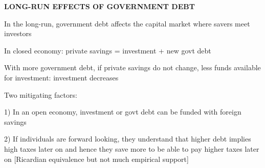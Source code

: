 \documentclass[landscape]{slides}
\begin{document}



\begin{slide}
\begin{center}
{\bf LONG-RUN EFFECTS OF GOVERNMENT DEBT}
\end{center}
In the long-run, government debt affects the capital market where savers meet investors

In closed economy: private savings = investment + new govt debt

With more government debt, if private savings do not change, less funds available for investment:
investment decreases  

Two mitigating factors:

1) In an open economy, investment or govt debt can be funded with foreign savings

2) If individuals are forward looking, they understand that higher debt implies high taxes
later on and hence they save more to be able to pay higher taxes later on [Ricardian equivalence
but not much empirical support]



%
%
%

\end{slide}
\end{document}
